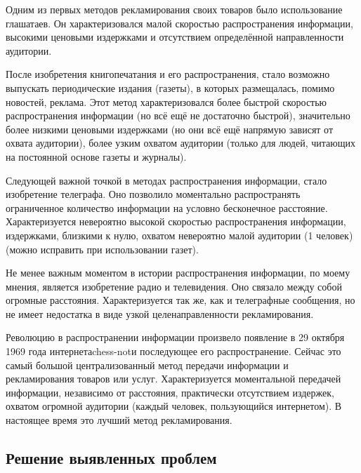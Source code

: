 Одним из первых методов рекламирования своих товаров было использование
глашатаев. Он характеризовался малой скоростью распространения информации,
высокими ценовыми издержками и отсутствием определённой направленности
аудитории.

После изобретения книгопечатания и его распространения, стало возможно
выпускать периодические издания (газеты), в которых размещалась, помимо
новостей, реклама. Этот метод характеризовался более быстрой скоростью
распространения информации (но всё ещё не достаточно быстрой), значительно
более низкими ценовыми издержками (но они всё ещё напрямую зависят от охвата
аудитории), более узким охватом аудитории (только для людей, читающих на
постоянной основе газеты и журналы).

Следующей важной точкой в методах распространения информации, стало изобретение
телеграфа. Оно позволило моментально распространять ограниченное количество
информации на условно бесконечное расстояние. Характеризуется невероятно
высокой скоростью распространения информации, издержками, близкими к нулю,
охватом невероятно малой аудитории (1 человек) (можно исправить при
использовании газет).

Не менее важным моментом в истории распространения информации, по моему мнения,
является изобретение радио и телевидения. Оно связало между собой огромные
расстояния. Характеризуется так же, как и телеграфные сообщения, но не имеет
недостатка в виде узкой целенаправленности рекламирования.

Революцию в распространении информации произвело появление в 29 октября 1969
года интернета\gls{chess-not}и последующее его распространение. Сейчас это самый большой
централизованный метод передачи информации и рекламирования товаров или услуг.
Характеризуется моментальной передачей информации, независимо от расстояния,
практически отсутствием издержек, охватом огромной аудитории (каждый человек,
пользующийся интернетом). В настоящее время это лучший метод рекламирования.

\subsection{Решение выявленных проблем}
